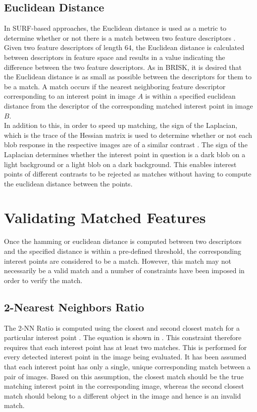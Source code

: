 \documentclass[11pt]{report}
\begin{document}
\subsection{Euclidean Distance}
\label{sec:euclidean}
In SURF-based approaches,  the Euclidean distance is used as a metric to determine whether or not there is a match between two feature descriptors \cite{Lowe2004}. Given two feature descriptors of length $64$, the Euclidean distance is calculated between descriptors in feature space and results in a value indicating the difference between the two feature descriptors. As in BRISK, it is desired that the Euclidean distance is as small as possible between the descriptors for them to be a match. A match occurs if the nearest neighboring feature descriptor corresponding to an interest point in image $A$ is within a specified euclidean distance from the descriptor of the corresponding matched interest point in image $B$.\\

In addition to this, in order to speed up matching, the sign of the Laplacian, which is the trace of the Hessian matrix is used to determine whether or not each blob response in the respective images are of a similar contrast \cite{Bay2008}. The sign of the Laplacian determines whether the interest point in question is a dark blob on a light background or a light blob on a dark background. This enables interest points of different contrasts to be rejected as matches without having to compute the euclidean distance between the points.\\

\section{Validating Matched Features}
\label{sec:validation}
Once the hamming or euclidean distance is computed between two descriptors and the specified distance is within a pre-defined threshold, the corresponding interest points are considered to be a match. However, this match may not necessarily be a valid match and a number of constraints have been imposed in order to verify the match.\\

\subsection{2-Nearest Neighbors Ratio}
\label{sec:2nnMatching}
The 2-NN Ratio is computed using the closest and second closest match for a particular interest point \cite{Lowe2004}. The equation is shown in . This constraint therefore requires that each interest point has at least two matches. This is performed for every detected interest point in the image being evaluated. It has been assumed that each interest point has only a single, unique corresponding match between a pair of images. Based on this assumption, the closest match should be the true matching interest point in the corresponding image, whereas the second closest match should belong to a different object in the image and hence is an invalid match.\\
\end{document}
